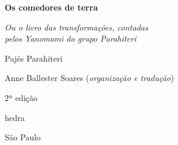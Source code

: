 




\begingroup\thispagestyle{empty}\vspace*{.05\textheight} 

            
              {\formular
              \huge
              \noindent
              \textbf{Os comedores de terra}\\
              
              \vspace{-0.5cm}
              
              }

              \vspace{0.5cm}

              \noindent{}\textit{Ou o livro das transformações, contadas\\pelos Yanomami do  grupo Parahiteri}

              \vspace{1cm}
              
              {\formular\Large
              \noindent{}Pajés Parahiteri
              }

              \vfill              

              {\small
              \noindent{}Anne Ballester Soares (\textit{organização e tradução})
              }

              \vspace{0.5cm}

              {\small\noindent{}2ª edição}
    \vfill

\newfontfamily{}
              \fontsize{30}{40}\selectfont \minion\small

              \newfontfamily{}
              {\noindent\fontsize{30}{40}\selectfont \timesnewroman hedra}
              
              {\selectfont\minion\small
              \noindent São Paulo \quad\the\year}

\endgroup
\pagebreak
